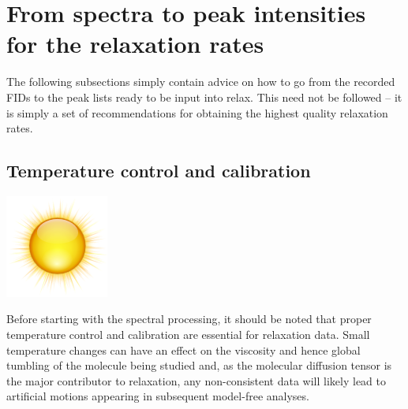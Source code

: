 
\section{From spectra to peak intensities for the relaxation rates} \label{sect: spectra to intensities}

The following subsections simply contain advice on how to go from the recorded FIDs to the peak lists ready to be input into relax.  This need not be followed -- it is simply a set of recommendations for obtaining the highest quality relaxation rates.



\subsection{Temperature control and calibration} \label{sect: temperature control and calibration}

\includegraphics[bb=0 0 18 18]{graphics/oxygen_icons/128x128/status/weather-clear}

Before starting with the spectral processing, it should be noted that proper temperature control and calibration are essential for relaxation data.  Small temperature changes can have an effect on the viscosity and hence global tumbling of the molecule being studied and, as the molecular diffusion tensor is the major contributor to relaxation, any non-consistent data will likely lead to artificial motions appearing in subsequent model-free analyses.

